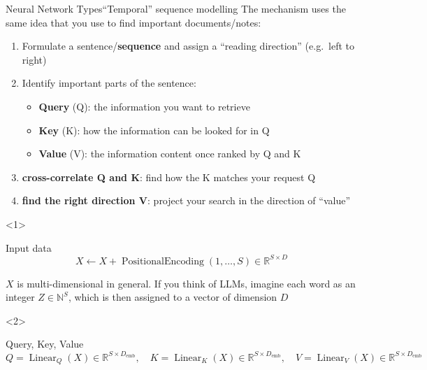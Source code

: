 \begin{frame}{Neural Network Types}{\enquote{Temporal} sequence modelling}
    The mechanism uses the same idea that you use to find important documents/notes:

    \vfill

    \begin{enumerate}
        \item<1-> Formulate a sentence/\textbf{sequence} and assign a \enquote{reading direction} (e.g.\ left to right)
        \item<2-> Identify important parts of the sentence:
            \begin{itemize}
                \item \textbf{Query} (Q): the information you want to retrieve
                \item \textbf{Key} (K): how the information can be looked for in Q
                \item \textbf{Value} (V): the information content once ranked by Q and K
            \end{itemize}
        \item<3-> \textbf{cross-correlate Q and K}: find how the K matches your request Q
        \item<4-> \textbf{find the right direction V}: project your search in the direction of \enquote{value}
    \end{enumerate}

    \vfill

    \begin{onlyenv}<1>
        \begin{block}{Input data}
            \begin{equation*}
                X \gets X + \operatorname{PositionalEncoding}(1, \dots, S) \in \mathbb{R}^{S \times D}
            \end{equation*}
        \end{block}

        {\tiny $X$ is multi-dimensional in general. If you think of LLMs, imagine each word as an integer $Z \in \mathbb{N}^{S}$, which is then assigned to a vector of dimension $D$}
    \end{onlyenv}

    \begin{onlyenv}<2>
        \begin{block}{Query, Key, Value}
            \begin{equation*}
                Q = \operatorname{Linear}_Q(X) \in \mathbb{R}^{S \times D_{\text{emb}}},
                \quad
                K = \operatorname{Linear}_K(X) \in \mathbb{R}^{S \times D_{\text{emb}}},
                \quad
                V = \operatorname{Linear}_V(X) \in \mathbb{R}^{S \times D_{\text{emb}}}
            \end{equation*}
        \end{block}
    \end{onlyenv}


\end{frame}
